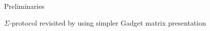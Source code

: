 \begin{section}{Preliminaries}
%          
% 
%          
%          
% 
%        
%        
% 
% 

  \begin{subsection}{$\Sigma$-protocol revisited by using simpler Gadget matrix presentation}


\end{subsection}
\end{section}
